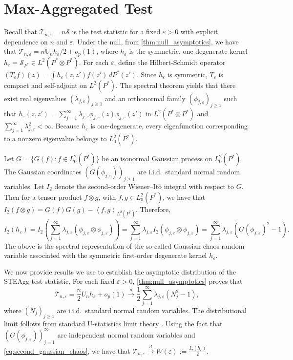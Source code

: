 \documentclass{article}
\theoremstyle{plain}
\theoremstyle{definition}
\theoremstyle{remark}
\newcommand{\U}{\mathbb{U}}
\newcommand{\of}[1]{\left(#1\right)}
\newcommand{\cT}{\mathcal{T}}
\newcommand{\1}{\mathbbm{1}}
\newcommand{\STE}{\mathscr{S}}
\newcommand{\eps}{\varepsilon}
\newcommand{\iprod}[1]{\left\langle #1 \right\rangle}
\theoremstyle{plain}
\theoremstyle{definition}
\begin{document}
\section{Max-Aggregated Test}\label{appendix:agg}

Recall that $\cT_{n,\eps}=n\overline{\STE}$ is the test statistic for a fixed $\eps > 0$ with explicit dependence on $n$ and $\eps$. Under the null, from \cref{thm:null_asymptotics}, we have that $\cT_{n, \eps} = n{\U_n} h_\eps / 2 + o_p(1)$, where $h_\eps$ is the symmetric, one-degenerate kernel $h_\eps = \ddot{\STE}_{P^*}\in L^2(P^*\otimes P^*)$. For each $\eps$, define the Hilbert-Schmidt operator $(T_\eps f)(z)=\int h_\eps(z,z')f(z')\,dP^*(z')$.
Since $h_\eps$ is symmetric, $T_\eps$ is compact and self-adjoint on $L^2(P^*)$. The spectral theorem yields that there exist real eigenvalues $(\lambda_{j,\eps})_{j \ge 1}$ and an orthonormal family $(\phi_{j,\eps})_{j \ge 1}$ such that $h_\eps(z,z')=\sum_{j=1}^\infty \lambda_{j,\eps}\phi_{j,\eps}(z)\phi_{j,\eps}(z')$ in $L^2(P^*\otimes P^*)$ and $\sum_{j=1}^\infty \lambda_{j,\eps}^2<\infty$.
Because $h_\eps$ is one-degenerate, every eigenfunction corresponding to a nonzero eigenvalue belongs to $L_0^2(P^*)$. 

Let $G=\{G(f):f\in L_0^2(P^*)\}$ be an isonormal Gaussian process on $L_0^2(P^*)$. The Gaussian coordinates $(G(\phi_{j,\eps}))_{j\ge1}$ are i.i.d.\ standard normal random variables. Let $I_2$ denote the second-order Wiener--It\^o integral with respect to $G$. Then for a tensor product $f \otimes g$, with $f, g \in L_0^2(P^*)$, we have that $I_2(f \otimes g) = G(f)G(g) - \iprod{f,g}_{L^2(P^*)}$. Therefore, 
\begin{equation}\label{eq:second_gaussian_chaos}
I_2(h_\eps) = I_2\of{\sum_{j=1}^\infty \lambda_{j, \eps} \of{\phi_{j, \eps} \otimes \phi_{j, \eps}}} =  \sum_{j=1}^\infty \lambda_{j, \eps} I_2\of{\phi_{j, \eps} \otimes \phi_{j, \eps}} = \sum_{j=1}^\infty \lambda_{j, \eps} \of{G(\phi_{j, \eps})^2 - 1}.
\end{equation}
The above is the spectral representation of the so-called Gaussian chaos random variable \citep[Chap.~2]{janson1997gaussian} associated with the symmetric first-order degenerate kernel $h_\eps$. 


We now provide results we use to establish the asymptotic distribution of the STEAgg test statistic. For each fixed $\eps>0$, \cref{thm:null_asymptotics} proves that
\[
\mathcal T_{n,\varepsilon}
=
\frac{n}{2}U_n h_\varepsilon + o_p(1)
\xrightarrow{d}
\frac12\sum_{j=1}^\infty \lambda_{j,\varepsilon}(N_j^2-1),
\]
where $(N_j)_{j\ge1}$ are i.i.d.\ standard normal random variables. The distributional limit follows from standard U-statistics limit theory \citep[Thm.~1]{leucht2013degenerate}. Using the fact that $(G(\phi_{j, \eps}))_{j=1}^\infty$ are independent normal random variables and \eqref{eq:second_gaussian_chaos}, we have that $\cT_{n, \eps} \xrightarrow[]{d} W(\eps) := \frac{I_2(h_\eps)}{2}$. 
\end{document}
